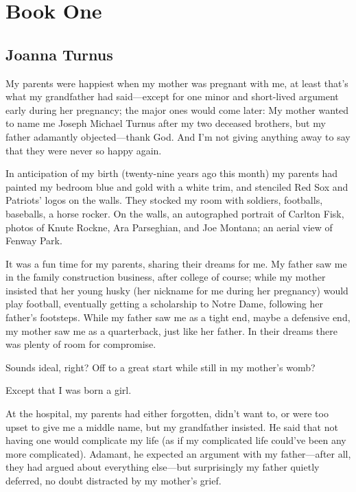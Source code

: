 \part{Book One}\setcounter{chapter}{0}

\chapter{Joanna Turnus}

\titlemark

My parents were happiest when my mother was pregnant with me, at least
that's what my grandfather had said---except for one minor and
short-lived argument early during her pregnancy; the major ones would
come later: My mother wanted to name me Joseph Michael Turnus after my
two deceased brothers, but my father adamantly objected---thank God. And
I'm not giving anything away to say that they were never so happy again.

In anticipation of my birth (twenty-nine years ago this month) my
parents had painted my bedroom blue and gold with a white trim, and
stenciled Red Sox and Patriots' logos on the walls. They stocked my room
with soldiers, footballs, baseballs, a horse rocker. On the walls, an
autographed portrait of Carlton Fisk, photos of Knute Rockne, Ara
Parseghian, and Joe Montana; an aerial view of Fenway Park.

It was a fun time for my parents, sharing their dreams for me. My father
saw me in the family construction business, after college of course;
while my mother insisted that her young husky (her nickname for me
during her pregnancy) would play football, eventually getting a
scholarship to Notre Dame, following her father's footsteps. While my
father saw me as a tight end, maybe a defensive end, my mother saw me as
a quarterback, just like her father. In their dreams there was plenty of
room for compromise.

Sounds ideal, right? Off to a great start while still in my mother's
womb?

Except that I was born a girl.

At the hospital, my parents had either forgotten, didn't want to, or
were too upset to give me a middle name, but my grandfather insisted. He
said that not having one would complicate my life (as if my complicated
life could've been any more complicated). Adamant, he expected an
argument with my father---after all, they had argued about everything
else---but surprisingly my father quietly deferred, no doubt distracted
by my mother's grief.

